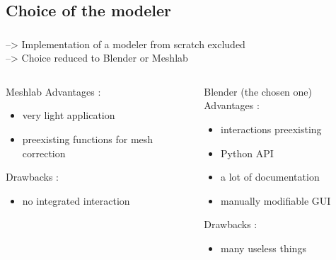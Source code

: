 \documentclass{beamer}
\begin{document}
\subsection{Choice of the modeler}
\begin{frame}
	\frametitle{}
		--> Implementation of a modeler from scratch excluded \\
		--> Choice reduced to Blender or Meshlab
    \begin{columns}[t]
  	\begin{column}{5cm}
  		\begin{block}{Meshlab}
  		Advantages :
  		\begin{itemize}
  		\item very light application
  		\item preexisting functions for mesh correction
  		\end{itemize}
  		
  		Drawbacks :
  		\begin{itemize}
  		\item no integrated interaction
  		\end{itemize}
 	 	\end{block}   
  	\end{column}
  
  	\begin{column}{5cm}
  		\begin{block}{Blender (the chosen one)}
  		Advantages :
  		\begin{itemize}
  		\item interactions preexisting 
  		\item Python API  
  		\item a lot of documentation
  		\item manually modifiable GUI
  		\end{itemize}
  		
  		Drawbacks :
  		\begin{itemize}
  		\item many useless things
  		\end{itemize}
 	 	\end{block}   
  	\end{column}
 	\end{columns}  
    
\end{frame}
\end{document}
